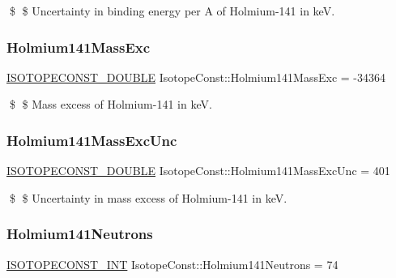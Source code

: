 \$ \$ Uncertainty in binding energy per A of Holmium-\/141 in keV. \mbox{\label{group___isotope_const-_holmium-_ho141_ga7f8df18b782a34bdeb2f3ff52a4fdc8b}} 
\subsubsection{\texorpdfstring{Holmium141\+Mass\+Exc}{Holmium141MassExc}}
{\footnotesize\ttfamily \mbox{\hyperlink{group___isotope_const-_macros_ga8f45a7272ce02c0b4c65c44636ed719a}{I\+S\+O\+T\+O\+P\+E\+C\+O\+N\+S\+T\+\_\+\+D\+O\+U\+B\+LE}} Isotope\+Const\+::\+Holmium141\+Mass\+Exc = -\/34364}

\$ \$ Mass excess of Holmium-\/141 in keV. \mbox{\label{group___isotope_const-_holmium-_ho141_ga94d181041a8ca69ae1e7d83792272f33}} 
\subsubsection{\texorpdfstring{Holmium141\+Mass\+Exc\+Unc}{Holmium141MassExcUnc}}
{\footnotesize\ttfamily \mbox{\hyperlink{group___isotope_const-_macros_ga8f45a7272ce02c0b4c65c44636ed719a}{I\+S\+O\+T\+O\+P\+E\+C\+O\+N\+S\+T\+\_\+\+D\+O\+U\+B\+LE}} Isotope\+Const\+::\+Holmium141\+Mass\+Exc\+Unc = 401}

\$ \$ Uncertainty in mass excess of Holmium-\/141 in keV. \mbox{\label{group___isotope_const-_holmium-_ho141_ga502089df865f51c146d514a534133444}} 
\subsubsection{\texorpdfstring{Holmium141\+Neutrons}{Holmium141Neutrons}}
{\footnotesize\ttfamily \mbox{\hyperlink{group___isotope_const-_macros_ga5f18360b3e99483a35c32d789e62621c}{I\+S\+O\+T\+O\+P\+E\+C\+O\+N\+S\+T\+\_\+\+I\+NT}} Isotope\+Const\+::\+Holmium141\+Neutrons = 74}

